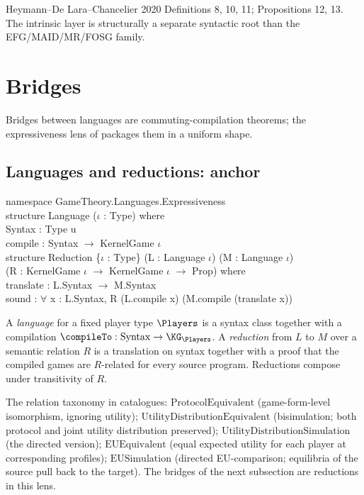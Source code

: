 \Textbook
Heymann–De Lara–Chancelier 2020 Definitions 8, 10, 11; Propositions
12, 13.  The intrinsic layer is structurally a separate syntactic
root than the EFG/MAID/MR/FOSG family.

\section{Bridges}
\label{sec:supp:bridges}

Bridges between languages are commuting-compilation theorems; the
expressiveness lens of  packages
them in a uniform shape.

\subsection{Languages and reductions: anchor}
\label{sec:supp:expressiveness}\label{def:Expressiveness.Language}\label{def:Expressiveness.Reduction}

\begin{leanbox}
namespace GameTheory.Languages.Expressiveness\\[1pt]
structure Language ($\iota$ : Type) where\\
\bd Syntax  : Type u\\
\bd compile : Syntax $\to$ KernelGame $\iota$\\[3pt]
structure Reduction \{$\iota$ : Type\} (L : Language $\iota$) (M : Language $\iota$)\\
\bd (R : KernelGame $\iota$ $\to$ KernelGame $\iota$ $\to$ Prop) where\\
\bd translate : L.Syntax $\to$ M.Syntax\\
\bd sound     : $\forall$ x : L.Syntax, R (L.compile x) (M.compile (translate x))
\end{leanbox}

\Mathematical
A \emph{language} for a fixed player type $\Players$ is a syntax
class together with a compilation $\compileTo : \mathrm{Syntax} \to
\KG_\Players$.  A \emph{reduction} from $L$ to $M$ over a semantic
relation $R$ is a translation on syntax together with a proof that
the compiled games are $R$-related for every source program.
Reductions compose under transitivity of $R$.

\Variants
The relation taxonomy in 
catalogues:
$\mathrm{ProtocolEquivalent}$ (game-form-level isomorphism,
ignoring utility); $\mathrm{UtilityDistributionEquivalent}$
(bisimulation; both protocol and joint utility distribution
preserved); $\mathrm{UtilityDistributionSimulation}$ (the directed
version); $\mathrm{EUEquivalent}$ (equal expected utility for each
player at corresponding profiles); $\mathrm{EUSimulation}$ (directed
EU-comparison; equilibria of the source pull back to the target).
The bridges of the next subsection are reductions in this lens.

